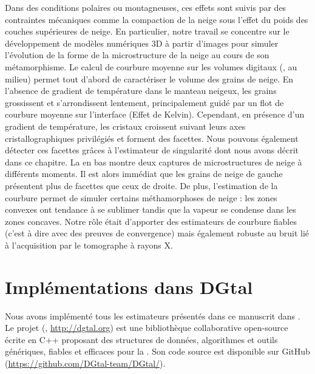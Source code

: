 Dans des conditions polaires ou montagneuses, ces effets sont suivis par des
contraintes mécaniques comme la compaction de la neige sous l'effet du poids des
couches supérieures de neige. En particulier, notre travail se concentre sur le
développement de modèles numériques 3D à partir d'images pour simuler
l'évolution de la forme de la microstructure de la neige au cours de son
métamorphisme. Le calcul de courbure moyenne sur les volumes digitaux
(, au milieu) permet tout d'abord de
caractériser le volume des grains de neige. En l'absence de gradient de
température dans le manteau neigeux, les grains grossissent et s'arrondissent
lentement, principalement guidé par un flot de courbure moyenne sur l'interface
(Effet de Kelvin). Cependant, en présence d'un gradient de température, les
cristaux croissent suivant leurs axes cristallographiques privilégiés et forment
des facettes. Nous pouvons également détecter ces facettes grâces à l'estimateur
de singularité dont nous avons décrit dans ce chapitre. La
 en bas montre deux captures de microstructures
de neige à différents moments. Il est alors immédiat que les grains de neige de
gauche présentent plus de facettes que ceux de droite. De plus, l'estimation de
la courbure permet de simuler certains méthamorphoses de neige : les zones
convexes ont tendance à se sublimer tandis que la vapeur se condense dans les
zones concaves. Notre rôle était d'apporter des estimateurs de courbure fiables
(c'est à dire avec des preuves de convergence) mais également robuste au bruit
lié à l'acquisition par le tomographe à rayons X.

\section{Implémentations dans DGtal}%
\label{sec:applications:dgtal}
%
Nous avons implémenté tous les estimateurs présentés dans ce manuscrit dans
\DGtal \cite{DGtal}. Le projet \DGtal (,
\url{http://dgtal.org}) est une bibliothèque collaborative open-source écrite en
\textsc{C++} proposant des structures de données, algorithmes et outils
génériques, fiables et efficaces pour la \DigitalGeometry. Son code source est
disponible sur GitHub (\url{https://github.com/DGtal-team/DGtal/}).

